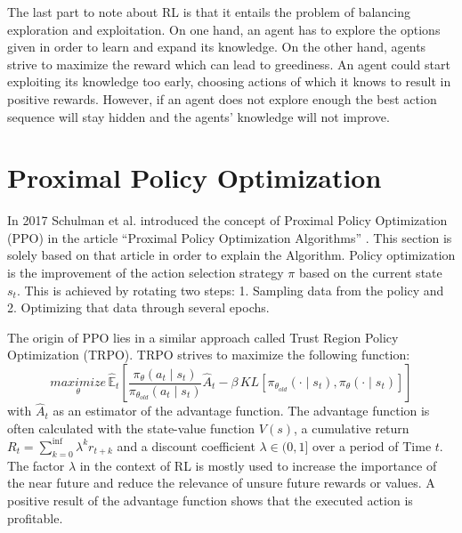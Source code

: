 The last part to note about RL is that it entails the problem of balancing exploration and exploitation. On one hand, an agent has to explore the options given in order to learn and expand its knowledge. On the other hand, agents strive to maximize the reward which can lead to greediness. An agent could start exploiting its knowledge too early,  choosing actions of which it knows to result in positive rewards. However, if an agent does not explore enough the best action sequence will stay hidden and the agents' knowledge will not improve.

\section{Proximal Policy Optimization}
In 2017 Schulman et al. introduced the concept of Proximal Policy Optimization (PPO) in
the article ``Proximal Policy Optimization Algorithms'' \cite{scwo17}.
This section is solely based on that article in order to explain the Algorithm.
Policy optimization is the improvement of the action selection strategy $\pi$ based on the current state $s_{t}$. This is achieved by rotating two steps: 1. Sampling data from the policy and 2. Optimizing that data through several epochs.

The origin of PPO lies in a similar approach called Trust Region Policy Optimization (TRPO). TRPO strives to maximize the following function:
\begin{equation}\label{TRPO}
    \underset{\theta}{maximize}\,\hat{\mathbb{E}}_{t} \left[ \frac{\pi_{\theta}(a_{t} \mid s_{t})}{\pi_{\theta_{old}}(a_{t} \mid s_{t})}
        \hat{A}_{t}-\beta \, KL[\pi_{\theta_{old}}(\cdot \mid s_{t}),\pi_{\theta}(\cdot \mid s_{t})] \right]
\end{equation}
with $\hat{A}_{t}$ as an estimator of the advantage function. The advantage function is often calculated with the state-value function $V(s)$, a cumulative return $R_t=\sum_{k=0}^{\inf} \lambda^{k}r_{t+k}$ \cite{mnba16} and a discount coefficient $\lambda \in (0,1]$ \cite{mnba16} over a period of Time $t$. The factor $\lambda$ in the context of RL is mostly used to increase the importance of the near future and reduce the relevance of unsure future rewards or values. A positive result of the advantage function shows that the executed action is profitable.

